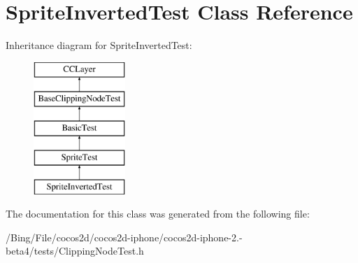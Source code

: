 \hypertarget{interface_sprite_inverted_test}{\section{Sprite\-Inverted\-Test Class Reference}
\label{interface_sprite_inverted_test}
}
Inheritance diagram for Sprite\-Inverted\-Test\-:\begin{figure}[H]
\begin{center}
\leavevmode
\includegraphics[height=5.000000cm]{interface_sprite_inverted_test}
\end{center}
\end{figure}


The documentation for this class was generated from the following file\-:\begin{DoxyCompactItemize}
\item 
/\-Bing/\-File/cocos2d/cocos2d-\/iphone/cocos2d-\/iphone-\/2.-\/beta4/tests/Clipping\-Node\-Test.\-h\end{DoxyCompactItemize}
